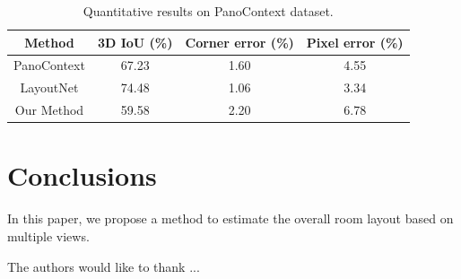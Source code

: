 \begin{table}
	\caption{Quantitative results on PanoContext dataset.}
	\label{tab:PC}
	\begin{tabular}{cccc}
		\toprule
		Method&3D IoU (\%)&Corner error (\%)&Pixel error (\%)\\
		\midrule
		PanoContext & 67.23 & 1.60 & 4.55\\
		LayoutNet & 74.48 & 1.06 & 3.34\\
		Our Method & 59.58 & 2.20 & 6.78\\		
		\bottomrule
	\end{tabular}
\end{table}

\section{Conclusions}
In this paper, we propose a method to estimate the overall room layout based on multiple views. 


\begin{acks}
  The authors would like to thank ...
\end{acks}
